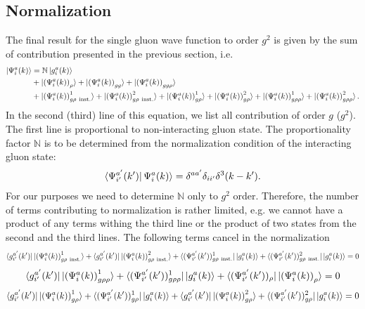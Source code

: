 \documentclass[aps,prd,amsmath,amssymb,nofootinbib]{revtex4-2}
\def\mf#1{\mathbb{#1}}
\numberwithin{equation}{section}
\begin{document}
\subsection{Normalization}
The final result for the single gluon wave function to order $g^2$ is given by the sum of contribution presented in the previous section, i.e. 
\begin{align}
  \ket{\Psi^{a}_{i}(k)}%
 & = \mf{N} \ket{ g_i^a(k) }%
 \\ \notag & + 
 \ket{ \left(\Psi^{a}_{i}(k) \right)_{\rho} }%
+\ket{ \left(\Psi^{a}_{i}(k) \right)_{gg} }%
+\ket{ \left(\Psi^{a}_{i}(k) \right)_{gg\rho} }%
\\ & +\ket{ \left(\Psi^{a}_{i}(k) \right)^{1}_{g \rho\ {\rm inst.} } }%
+\ket{ \left(\Psi^{a}_{i}(k) \right)^{2}_{g \rho\ {\rm inst.} } }%
+\ket{ \left(\Psi^{a}_{i}(k) \right)^{1}_{g \rho} }%
+\ket{ \left(\Psi^{a}_{i}(k) \right)^{2}_{g \rho} }%
+\ket{ \left(\Psi^{a}_{i}(k) \right)^{1}_{g\rho\rho} }%
+\ket{ \left(\Psi^{a}_{i}(k) \right)^{2}_{g\rho\rho} }. %
\label{Eq:intergluon}
\end{align}
In the second (third) line of this equation, we list all contribution of order $g$ ($g^2$). 
The first line is proportional to non-interacting gluon state. The proportionality factor  $\mf{N}$  is to be determined from the normalization 
condition of the interacting gluon state: 
\begin{align}
  \bra{\Psi^{a'}_{i'}(k')}%
  {\Psi^{a}_{i}(k)} \rangle%
  = \delta^{a a'} \delta_{i i'} \delta^{3}(k-k'). 
\end{align}
For our purposes we need to determine  $\mf{N}$ only to $g^2$ order. Therefore, the number of terms contributing to normalization is rather limited, 
e.g. we cannot have a product of any terms withing the third line or the product of two states from the second and the third lines. The following terms cancel in the normalization 
 $$  \bra{g^{a'}_{i'}(k')}\ket{ \left(\Psi^{a}_{i}(k) \right)^{1}_{g \rho\ {\rm inst.} } } + \bra{g^{a'}_{i'}(k')}\ket{ \left(\Psi^{a}_{i}(k) \right)^{2}_{g \rho\ {\rm inst.} } }+\bra{(\Psi^{a'}_{i'}(k'))^{1}_{g \rho\ {\rm inst.} } }\ket{g^{a}_{i}(k)} +\bra{(\Psi^{a'}_{i'}(k'))^{2}_{g \rho\ {\rm inst.} } }\ket{g^{a}_{i}(k)}  = 0 $$
 $$\bra{g^{a'}_{i'}(k')}\ket{ \left(\Psi^{a}_{i}(k) \right)^{1}_{g\rho\rho} }+ \bra{(\Psi^{a'}_{i'}(k'))^{1}_{g\rho\rho} }\ket{g^{a}_{i}(k)} + \bra{(\Psi^{a'}_{i'}(k'))_{\rho} }\ket{ \left(\Psi^{a}_{i}(k) \right)_{\rho} } = 0$$
 $$\bra{g^{a'}_{i'}(k')}\ket{ \left(\Psi^{a}_{i}(k) \right)^{1}_{g \rho} }+\bra{(\Psi^{a'}_{i'}(k'))^{1}_{g \rho} }\ket{g^{a}_{i}(k)} +\bra{g^{a'}_{i'}(k')}\ket{ \left(\Psi^{a}_{i}(k) \right)^{2}_{g \rho} }+\bra{(\Psi^{a'}_{i'}(k'))^{2}_{g \rho} }\ket{g^{a}_{i}(k)} = 0$$
\end{document}
